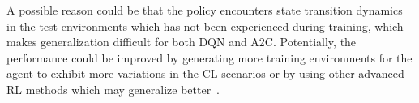 A possible reason could be that the policy encounters state transition dynamics in the test environments which has not been experienced during training, which makes generalization difficult for both DQN and A2C.
Potentially, the performance could be improved by generating more training environments for the agent to exhibit more variations in the CL scenarios or by using other advanced RL methods which may generalize better~.





